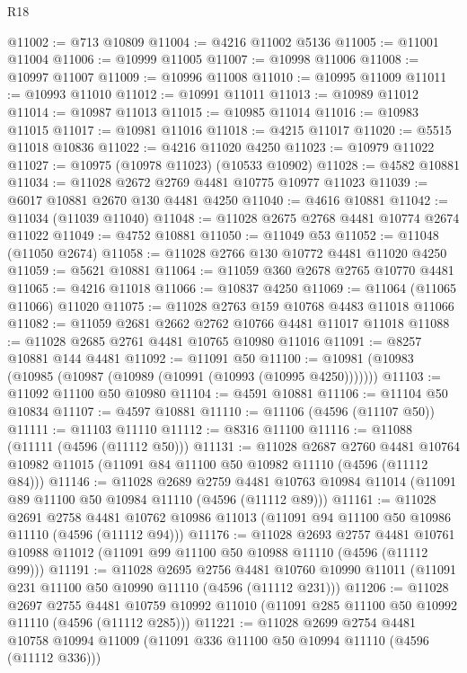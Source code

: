 \begin{lexlean}{R18}
\begin{coremodule}
@11002 := @713 @10809
@11004 := @4216 @11002 @5136
@11005 := @11001 @11004
@11006 := @10999 @11005
@11007 := @10998 @11006
@11008 := @10997 @11007
@11009 := @10996 @11008
@11010 := @10995 @11009
@11011 := @10993 @11010
@11012 := @10991 @11011
@11013 := @10989 @11012
@11014 := @10987 @11013
@11015 := @10985 @11014
@11016 := @10983 @11015
@11017 := @10981 @11016
@11018 := @4215 @11017
@11020 := @5515 @11018 @10836
@11022 := @4216 @11020 @4250
@11023 := @10979 @11022
@11027 := @10975 (@10978 @11023) (@10533 @10902)
@11028 := @4582 @10881
@11034 := @11028 @2672 @2769 @4481 @10775 @10977 @11023
@11039 := @6017 @10881 @2670 @130 @4481 @4250
@11040 := @4616 @10881
@11042 := @11034 (@11039 @11040)
@11048 := @11028 @2675 @2768 @4481 @10774 @2674 @11022
@11049 := @4752 @10881
@11050 := @11049 @53
@11052 := @11048 (@11050 @2674)
@11058 := @11028 @2766 @130 @10772 @4481 @11020 @4250
@11059 := @5621 @10881
@11064 := @11059 @360 @2678 @2765 @10770 @4481
@11065 := @4216 @11018
@11066 := @10837 @4250
@11069 := @11064 (@11065 @11066) @11020
@11075 := @11028 @2763 @159 @10768 @4483 @11018 @11066
@11082 := @11059 @2681 @2662 @2762 @10766 @4481 @11017 @11018
@11088 := @11028 @2685 @2761 @4481 @10765 @10980 @11016
@11091 := @8257 @10881 @144 @4481
@11092 := @11091 @50
@11100 := @10981 (@10983 (@10985 (@10987 (@10989 (@10991 (@10993 (@10995 @4250)))))))
@11103 := @11092 @11100 @50 @10980
@11104 := @4591 @10881
@11106 := @11104 @50 @10834
@11107 := @4597 @10881
@11110 := @11106 (@4596 (@11107 @50))
@11111 := @11103 @11110
@11112 := @8316 @11100
@11116 := @11088 (@11111 (@4596 (@11112 @50)))
@11131 := @11028
    @2687
    @2760
    @4481
    @10764
    @10982
    @11015
    (@11091 @84 @11100 @50 @10982 @11110 (@4596 (@11112 @84)))
@11146 := @11028
    @2689
    @2759
    @4481
    @10763
    @10984
    @11014
    (@11091 @89 @11100 @50 @10984 @11110 (@4596 (@11112 @89)))
@11161 := @11028
    @2691
    @2758
    @4481
    @10762
    @10986
    @11013
    (@11091 @94 @11100 @50 @10986 @11110 (@4596 (@11112 @94)))
@11176 := @11028
    @2693
    @2757
    @4481
    @10761
    @10988
    @11012
    (@11091 @99 @11100 @50 @10988 @11110 (@4596 (@11112 @99)))
@11191 := @11028
    @2695
    @2756
    @4481
    @10760
    @10990
    @11011
    (@11091 @231 @11100 @50 @10990 @11110 (@4596 (@11112 @231)))
@11206 := @11028
    @2697
    @2755
    @4481
    @10759
    @10992
    @11010
    (@11091 @285 @11100 @50 @10992 @11110 (@4596 (@11112 @285)))
@11221 := @11028
    @2699
    @2754
    @4481
    @10758
    @10994
    @11009
    (@11091 @336 @11100 @50 @10994 @11110 (@4596 (@11112 @336)))

\end{coremodule}
\end{lexlean}
